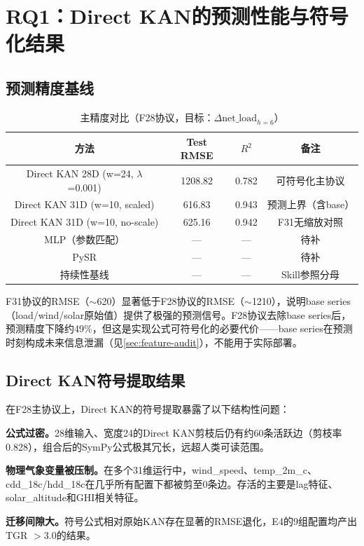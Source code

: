 \documentclass[12pt,a4paper,oneside]{ctexbook}
\begin{document}
\section{RQ1：Direct KAN的预测性能与符号化结果}

\subsection{预测精度基线}

\begin{table}[htbp]
\centering
\caption{主精度对比（F28协议，目标：$\Delta\text{net\_load}_{h=6}$）}
\label{tab:rq1-accuracy}
\begin{tabular}{cccc}
\toprule
方法 & Test RMSE & $R^2$ & 备注 \\
\midrule
Direct KAN 28D (w=24, $\lambda$=0.001) & 1208.82 & 0.782 & 可符号化主协议 \\
Direct KAN 31D (w=10, scaled) & 616.83 & 0.943 & 预测上界（含base） \\
Direct KAN 31D (w=10, no-scale) & 625.16 & 0.942 & F31无缩放对照 \\
MLP（参数匹配） & — & — & 待补 \\
PySR & — & — & 待补 \\
持续性基线 & — & — & Skill参照分母 \\
\bottomrule
\end{tabular}
\end{table}

F31协议的RMSE（$\sim$620）显著低于F28协议的RMSE（$\sim$1210），说明base series（load/wind/solar原始值）提供了极强的预测信号。F28协议去除base series后，预测精度下降约49\%，但这是实现公式可符号化的必要代价——base series在预测时刻构成未来信息泄漏（见\cref{sec:feature-audit}），不能用于实际部署。

\subsection{Direct KAN符号提取结果}

在F28主协议上，Direct KAN的符号提取暴露了以下结构性问题：

\textbf{公式过密。}28维输入、宽度24的Direct KAN剪枝后仍有约60条活跃边（剪枝率0.828），组合后的SymPy公式极其冗长，远超人类可读范围。

\textbf{物理气象变量被压制。}在多个31维运行中，wind\_speed、temp\_2m\_c、cdd\_18c/hdd\_18c在几乎所有配置下都被剪至0条边。存活的主要是lag特征、solar\_altitude和GHI相关特征。

\textbf{迁移间隙大。}符号公式相对原始KAN存在显著的RMSE退化，E4的9组配置均产出TGR $> 3.0$的结果。
\end{document}
